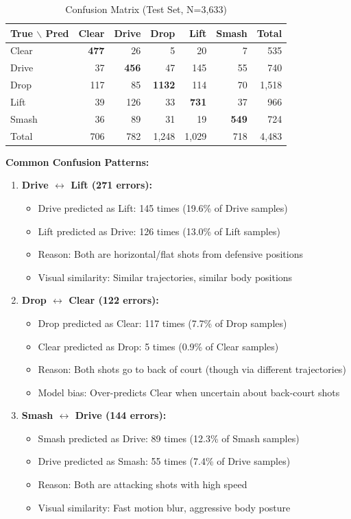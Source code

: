 \documentclass[11pt,a4paper]{article}
\begin{document}
\begin{table}[H]
\centering
\caption{Confusion Matrix (Test Set, N=3,633)}
\begin{tabular}{l|rrrrr|r}
\toprule
True $\backslash$ Pred & Clear & Drive & Drop & Lift & Smash & Total \\
\midrule
Clear & \textbf{477} & 26 & 5 & 20 & 7 & 535 \\
Drive & 37 & \textbf{456} & 47 & 145 & 55 & 740 \\
Drop & 117 & 85 & \textbf{1132} & 114 & 70 & 1,518 \\
Lift & 39 & 126 & 33 & \textbf{731} & 37 & 966 \\
Smash & 36 & 89 & 31 & 19 & \textbf{549} & 724 \\
\midrule
Total & 706 & 782 & 1,248 & 1,029 & 718 & 4,483 \\
\bottomrule
\end{tabular}
\end{table}

\textbf{Common Confusion Patterns:}

\begin{enumerate}
\item \textbf{Drive $\leftrightarrow$ Lift (271 errors):}
   \begin{itemize}
   \item Drive predicted as Lift: 145 times (19.6\% of Drive samples)
   \item Lift predicted as Drive: 126 times (13.0\% of Lift samples)
   \item Reason: Both are horizontal/flat shots from defensive positions
   \item Visual similarity: Similar trajectories, similar body positions
   \end{itemize}

\item \textbf{Drop $\leftrightarrow$ Clear (122 errors):}
   \begin{itemize}
   \item Drop predicted as Clear: 117 times (7.7\% of Drop samples)
   \item Clear predicted as Drop: 5 times (0.9\% of Clear samples)
   \item Reason: Both shots go to back of court (though via different trajectories)
   \item Model bias: Over-predicts Clear when uncertain about back-court shots
   \end{itemize}

\item \textbf{Smash $\leftrightarrow$ Drive (144 errors):}
   \begin{itemize}
   \item Smash predicted as Drive: 89 times (12.3\% of Smash samples)
   \item Drive predicted as Smash: 55 times (7.4\% of Drive samples)
   \item Reason: Both are attacking shots with high speed
   \item Visual similarity: Fast motion blur, aggressive body posture
   \end{itemize}
\end{enumerate}
\end{document}
